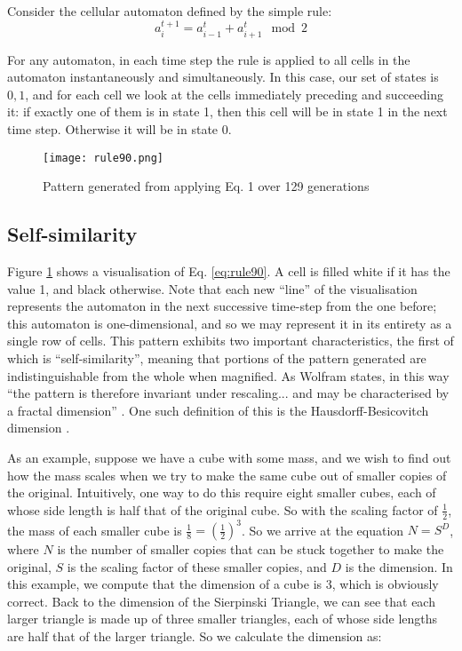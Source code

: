 \documentclass[11pt,a4paper]{article}
\begin{document}
    Consider the cellular automaton defined by the simple rule:
    \begin{equation}
        \label{eq:rule90}
        a_{i}^{t+1} = a_{i-1}^{t} + a_{i+1}^{t} \mod{2}
    \end{equation}

    For any automaton, in each time step the rule is applied to all cells in the
    automaton instantaneously and simultaneously. In this case, our set of
    states is ${0,1}$, and for each cell we look at the cells immediately
    preceding and succeeding it: if exactly one of them is in state 1, then this
    cell will be in state 1 in the next time step. Otherwise it will be in state
    0.

    \begin{figure}[h]
        \begin{center}
            \texttt{[image: rule90.png]}
            \caption{Pattern generated from applying Eq. 1 over 129 generations}
            \label{fig:rule90}
        \end{center}
    \end{figure}

    \subsection{Self-similarity}
    Figure \ref{fig:rule90} shows a visualisation of Eq. \ref{eq:rule90}. A cell is
    filled white if it has the value 1, and black otherwise. Note that each new
    ``line'' of the visualisation represents the automaton in the next
    successive time-step from the one before; this automaton is one-dimensional,
    and so we may represent it in its entirety as a single row of cells. This
    pattern exhibits two important characteristics, the first of which is
    ``self-similarity'', meaning that portions of the pattern generated are
    indistinguishable from the whole when magnified. As Wolfram states, in this
    way ``the pattern is therefore invariant under rescaling... and may be
    characterised by a fractal dimension'' \cite{WolframFractal}. One such
    definition of this is the Hausdorff-Besicovitch dimension \cite{Hausdorff}.

    As an example, suppose we have a cube with some mass, and we wish to find
    out how the mass scales when we try to make the same cube out of smaller
    copies of the original. Intuitively, one way to do this require eight
    smaller cubes, each of whose side length is half that of the original cube.
    So with the scaling factor of $\frac{1}{2}$, the mass of each smaller cube
    is $\frac{1}{8} = (\frac{1}{2})^3$.
    So we arrive at the equation $N = S^D$, where $N$ is the number of smaller
    copies that can be stuck together to make the original, $S$ is the scaling
    factor of these smaller copies, and $D$ is the dimension. In this example, we
    compute that the dimension of a cube is 3, which is obviously correct.  Back
    to the dimension of the Sierpinski Triangle, we can see that each larger
    triangle is made up of three smaller triangles, each of whose side lengths
    are half that of the larger triangle. So we calculate the dimension as:
\end{document}
